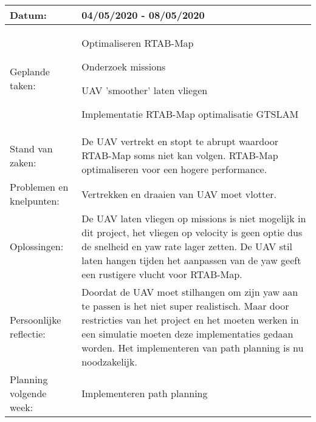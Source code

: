 \begin{tabularx}{\textwidth}{| l | X |}
  \hline
  Datum: & 04/05/2020 - 08/05/2020\\
  \hline
  Geplande taken: &
  \begin{compactitem}
    \item Optimaliseren RTAB-Map
    \item Onderzoek missions
    \item UAV 'smoother' laten vliegen
    \item Implementatie RTAB-Map optimalisatie GTSLAM
  \end{compactitem}\\
  \hline
  Stand van zaken: & De UAV vertrekt en stopt te abrupt waardoor RTAB-Map soms niet kan volgen. RTAB-Map optimaliseren voor een hogere performance.\\
  \hline
  Problemen en knelpunten: & Vertrekken en draaien van UAV moet vlotter.\\
  \hline
  Oplossingen: & De UAV laten vliegen op missions is niet mogelijk in dit project, het vliegen op velocity is geen optie dus de snelheid en yaw rate lager zetten. De UAV stil laten hangen tijden het aanpassen van de yaw geeft een rustigere vlucht voor RTAB-Map.\\
  \hline
  Persoonlijke reflectie: & Doordat de UAV moet stilhangen om zijn yaw aan te passen is het niet super realistisch. Maar door restricties van het project en het moeten werken in een simulatie moeten deze implementaties gedaan worden. Het implementeren van path planning is nu noodzakelijk.\\
  \hline
  Planning volgende week: &
  \begin{compactitem}
    \item Implementeren path planning
  \end{compactitem}\\
  \hline
\end{tabularx}